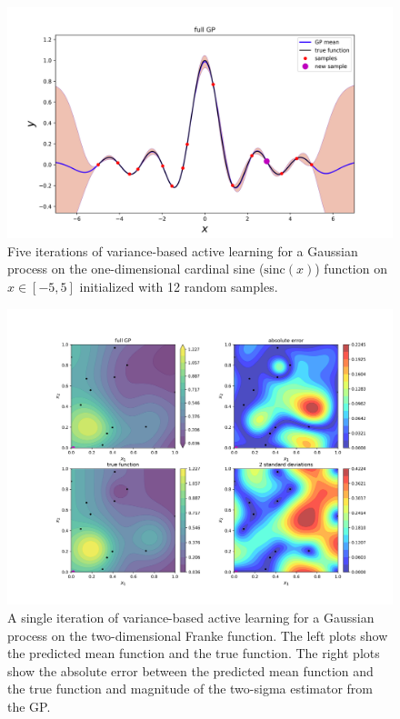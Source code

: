 \documentclass[conference]{IEEEtran}
\begin{document}
\begin{figure}[htbp]
    \includegraphics[width=0.74\linewidth]{final-project/update/plots/gp-12to20-pt16.png} \vspace*{-1em}
    \caption{Five iterations of variance-based active learning for a Gaussian process on the one-dimensional cardinal sine ($\text{sinc}(x)$) function on $x\in [-5,5]$ initialized with 12 random samples.}
    \label{fig:sinc-gp}
\end{figure}


\begin{figure}[h]
    \centering
    \includegraphics[width=0.99\linewidth]{final-project/update/plots/gp-20to40-pt23.png}
    \caption{A single iteration of variance-based active learning for a Gaussian process on the two-dimensional Franke function. The left plots show the predicted mean function and the true function. The right plots show the absolute error between the predicted mean function and the true function and magnitude of the two-sigma estimator from the GP.}
    \label{fig:franke-gp}
\end{figure}
\end{document}
